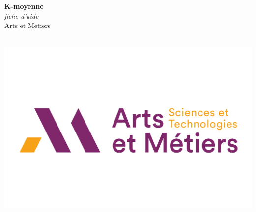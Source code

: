 \documentclass[a0,portrait]{a0poster}
\begin{document}


\begin{minipage}[b]{0.75\linewidth}
\veryHuge \color{NavyBlue} \textbf{K-moyenne} \color{Black}\\ %
\Huge\textit{fiche d'aide}\\[2cm] %
\huge Arts et Metiers\\[0.4cm] %
\\
\end{minipage}
%
\begin{minipage}[b]{0.25\linewidth}
\includegraphics[width=20cm]{logo.png}\\
\end{minipage}

\vspace{1cm} %


\end{document}
